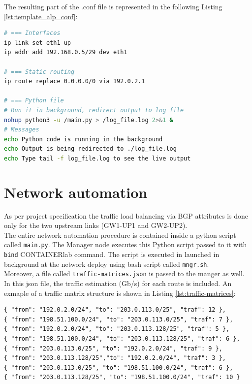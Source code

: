 \documentclass{report}
\begin{document}
The resulting part of the .conf file is represented in the following Listing \ref{lst:template_alp_conf}:
\begin{lstlisting}[language=sh, style=styleShell, caption=Alpine configuration example, label=lst:template_alp_conf]
# === Interfaces
ip link set eth1 up
ip addr add 192.168.0.5/29 dev eth1

# === Static routing
ip route replace 0.0.0.0/0 via 192.0.2.1

# === Python file 
# Run it in background, redirect output to log file
nohup python3 -u /main.py > /log_file.log 2>&1 &
# Messages
echo Python code is running in the background
echo Output is being redirected to ./log_file.log
echo Type tail -f log_file.log to see the live output
\end{lstlisting}

\section{Network automation}
As per project specification the traffic load balancing via BGP attributes is done only for the two upstream links (GW1-UP1 and GW2-UP2).\\
The entire network automation procedure is contained inside a python script called \texttt{main.py}.
The Manager node executes this Python script passed to it with \texttt{bind} CONTAINERlab command. The script is executed in launched in background at the network deploy using bash script called \texttt{mngr.sh}.\\
Moreover, a file called \texttt{traffic-matrices.json} is passed to the manger as well. In this json file, the traffic estimation (Gb/s) for each route is included. An exmaple of a traffic matrix structure is shown in Listing \ref{lst:traffic-matrices}:
\begin{lstlisting}[style=styleJson, caption=A Traffic Matrix, label=lst:traffic-matrices]
{ "from": "192.0.2.0/24", "to": "203.0.113.0/25", "traf": 12 },
{ "from": "198.51.100.0/24", "to": "203.0.113.0/25", "traf": 7 },
{ "from": "192.0.2.0/24", "to": "203.0.113.128/25", "traf": 5 },
{ "from": "198.51.100.0/24", "to": "203.0.113.128/25", "traf": 6 },
{ "from": "203.0.113.0/25", "to": "192.0.2.0/24", "traf": 9 },
{ "from": "203.0.113.128/25","to": "192.0.2.0/24", "traf": 3 },
{ "from": "203.0.113.0/25", "to": "198.51.100.0/24", "traf": 6 },
{ "from": "203.0.113.128/25", "to": "198.51.100.0/24", "traf": 10 }
\end{lstlisting}
\end{document}
